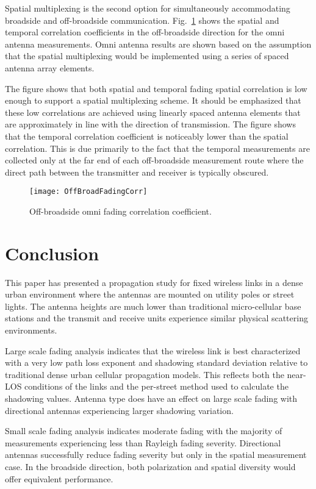 \documentclass[12pt]{IEEEtran}
\begin{document}
Spatial multiplexing is the second option for simultaneously accommodating broadside and off-broadside communication.  Fig.~\ref{fg.oBrdCorr} shows the spatial and temporal correlation coefficients in the off-broadside direction for the omni antenna measurements.  Omni antenna results are shown based on the assumption that the spatial multiplexing would be implemented using a series of spaced antenna array elements.

The figure shows that both spatial and temporal fading spatial correlation is low enough to support a spatial multiplexing scheme.  It should be emphasized that these low correlations are achieved using linearly spaced antenna elements that are approximately in line with the direction of transmission.  The figure shows that the temporal correlation coefficient is noticeably lower than the spatial correlation.  This is due primarily to the fact that the temporal measurements are collected only at the far end of each off-broadside measurement route where the direct path between the transmitter and receiver is typically obscured.


\begin{figure}[htbp]
\centerline{\texttt{[image: OffBroadFadingCorr]}}
\caption{Off-broadside omni fading correlation coefficient.}
\label{fg.oBrdCorr}
\end{figure}




\section{Conclusion}
\label{sec:concl}

This paper has presented a propagation study for fixed wireless links in a dense urban environment where the antennas are mounted on utility poles or street lights.  The antenna heights are much lower than traditional micro-cellular base stations and the transmit and receive units experience similar physical scattering environments.

Large scale fading analysis indicates that the wireless link is best characterized with a very low path loss exponent and shadowing standard deviation relative to traditional dense urban cellular propagation models.  This reflects both the near-LOS conditions of the links and the per-street method used to calculate the shadowing values.  Antenna type does have an effect on large scale fading with directional antennas experiencing larger shadowing variation.

Small scale fading analysis indicates moderate fading with the majority of measurements experiencing less than Rayleigh fading severity.  Directional antennas successfully reduce fading severity but only in the spatial measurement case.  In the broadside direction, both polarization and spatial diversity would offer equivalent performance.
\end{document}
